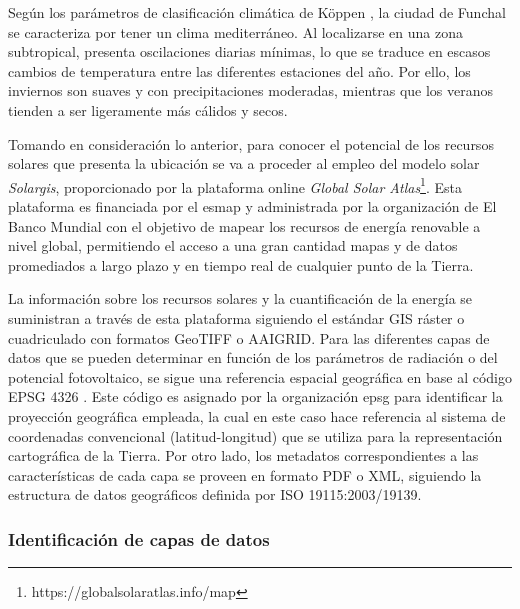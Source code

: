 \vspace{3mm}

Según los parámetros de clasificación climática de Köppen \cite{koppen}, la ciudad de Funchal se caracteriza por tener un clima mediterráneo. Al localizarse en una zona subtropical, presenta oscilaciones diarias mínimas, lo que se traduce en escasos cambios de temperatura entre las diferentes estaciones del año. Por ello, los inviernos son suaves y con precipitaciones moderadas, mientras que los veranos tienden a ser ligeramente más cálidos y secos. 

\vspace{3mm}

Tomando en consideración lo anterior, para conocer el potencial de los recursos solares que presenta la ubicación se va a proceder al empleo del modelo solar \textit{Solargis}, proporcionado por la plataforma online \textit{Global Solar Atlas}\footnote{https://globalsolaratlas.info/map}. Esta plataforma es financiada por el \gls{esmap} y administrada por la organización de El Banco Mundial con el objetivo de mapear los recursos de energía renovable a nivel global, permitiendo el acceso a una gran cantidad mapas y de datos promediados a largo plazo y en tiempo real de cualquier punto de la Tierra. \cite{globalsolar} \cite{energydata}

\vspace{3mm}

La información sobre los recursos solares y la cuantificación de la energía se suministran a través de esta plataforma siguiendo el estándar GIS ráster o cuadriculado con formatos GeoTIFF o AAIGRID. Para las diferentes capas de datos que se pueden determinar en función de los parámetros de radiación o del potencial fotovoltaico, se sigue una referencia espacial geográfica en base al código EPSG 4326 \cite{epsg}. Este código es asignado por la organización \gls{epsg} para identificar la proyección geográfica empleada, la cual en este caso hace referencia al sistema de coordenadas convencional (latitud-longitud) que se utiliza para la representación cartográfica de la Tierra. Por otro lado, los metadatos correspondientes a las características de cada capa se proveen en formato PDF o XML, siguiendo la estructura de datos geográficos definida por ISO 19115:2003/19139.~\cite{globalsolar} \cite{globalsolarreport}

\subsubsection{Identificación de capas de datos}

